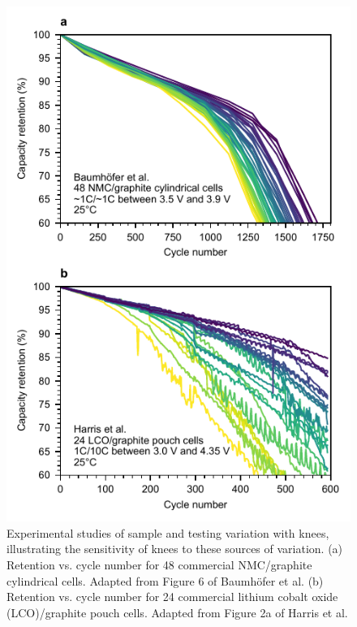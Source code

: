 \documentclass[journal=jpclcd,manuscript=article]{achemso}
\begin{document}
\begin{figure}[ht!]
\centering
\includegraphics[scale=1]{final_figures/variation_exp.pdf}
\caption{Experimental studies of sample and testing variation with knees, illustrating the sensitivity of knees to these sources of variation.
(a) Retention vs. cycle number for 48 commercial NMC/graphite cylindrical cells. Adapted from Figure 6 of Baumhöfer et al. \cite{baumhofer_production_2014}
(b) Retention vs. cycle number for 24 commercial lithium cobalt oxide (LCO)/graphite pouch cells. Adapted from Figure 2a of Harris et al.\cite{harris_failure_2017}
}
\label{fig:var_exp}
\end{figure}
\end{document}
